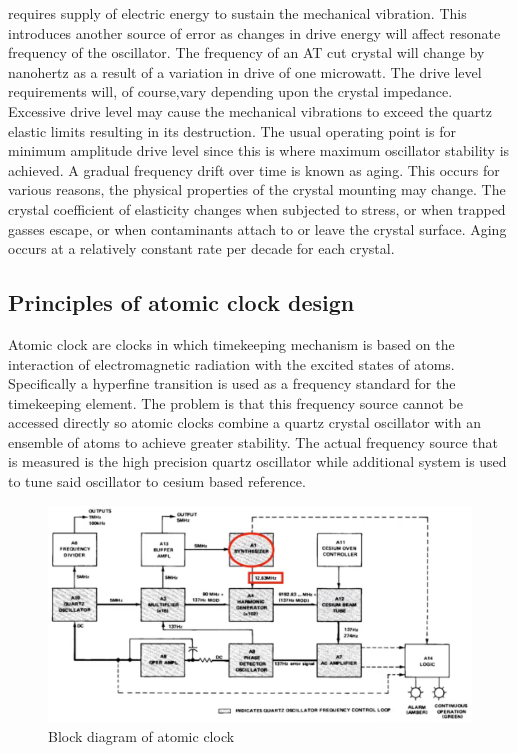 requires supply of electric energy to sustain the mechanical vibration.
This introduces another source of error as changes in drive energy will affect resonate frequency 
of the oscillator. The frequency of an AT cut crystal will change by nanohertz as a result
of a variation in drive of one microwatt.
The drive level requirements will, of course,vary depending upon the crystal impedance. 
Excessive drive level may cause the mechanical vibrations to exceed the quartz elastic limits 
resulting in its destruction. The usual operating point is for minimum amplitude drive level
since this is where maximum oscillator stability is achieved.
A gradual frequency drift over time is known as aging.
This occurs for various reasons, the physical properties of the crystal mounting may change.
The crystal coefficient of elasticity changes when subjected to stress, or when trapped gasses 
escape, or when contaminants attach to or leave the crystal surface. 
Aging occurs at a relatively constant rate per decade for each crystal.

\subsection{Principles of atomic clock design}
Atomic clock are clocks in which timekeeping mechanism is based on the interaction of 
electromagnetic radiation with the excited states of atoms.
Specifically a hyperfine transition is used as a frequency standard for the timekeeping element.
The problem is that this frequency source cannot be accessed directly so atomic clocks combine 
a quartz crystal oscillator with an ensemble of atoms to achieve greater stability.
The actual frequency source that is measured is the high precision quartz oscillator while 
additional system is used to tune said oscillator to cesium based reference.
\begin{figure}[htb] 
	\label{fig:atomic_diagram}
	\centering
	\includegraphics[width=\textwidth]{figures/atomic_diagram}
	\caption{Block diagram of atomic clock}
\end{figure}

